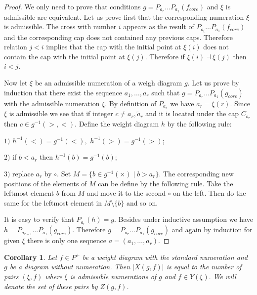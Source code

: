 \documentclass[12pt,reqno]{amsart}
\newtheorem{corollary}[thm]{Corollary}
\begin{document}
\begin{proof}  We only need to prove that conditions  $g=P_{a_r}\dots P_{a_1}(f_{core})$ and $\xi$ is admissible are equivalent.  Let us prove  first that the  corresponding numeration  $\xi$ is admissible. The cross with number $i$ appears as  the result of $P_{a_i}\dots P_{a_1}(f_{core})$  and the corresponding cap  does not contained any previous caps. Therefore relation $j<i$ implies  that  the cap with the initial point at $\xi(i)$ does not contain  the cap with the initial point at $\xi(j)$. Therefore if $\xi(i)\dashv \xi(j)$ then $i<j$. 


Now let $\xi$ be an admissible numeration of a weigh diagram $g$. Let us prove by induction that there exist the sequence $a_1,\dots,a_r$ 
such that  $g=P_{a_r}\dots P_{a_1}(g_{core})$  with the admissible numeration $\xi$. By definition of $P_{a_r}$ we have $a_r=\xi(r)$. Since $\xi$ is admissible we see that if  integer $c\ne a_r,\tilde a_r$  and  it is located   under the cap $C_{a_r}$ then $c\in g^{-1}(>,<)$.  Define the  weight diagram  $h$ by the following rule: 

$1)$ $h^{-1}(<)=g^{-1}(<),\,\,h^{-1}(>)=g^{-1}(>)$;

$2)$ if $b<a_r$ then $h^{-1}(b)=g^{-1}(b)$;

$3)$   replace $a_r$ by $\circ$. Set $M=\{b\in g^{-1}(\times)\mid b> a_r\}$. The corresponding new positions  of the elements of $M$ can be define by the following rule. Take the leftmost  element  $b$ from $M$ and   move it to  the second  $\circ $ on the left.  Then do  the same for the  leftmost element in   $M\setminus\{b\}$ and  so on. 

It is easy to verify  that $P_{a_r}(h)=g.$ Besides under inductive assumption we have $h=P_{a_{r-1}}\dots P_{a_1}(g_{core})$. Therefore 
$g=P_{a_r}\dots P_{a_1}(g_{core})$ and again by induction for given $\xi$ there is only one sequence $a=(a_1,\dots,a_r)$.
\end{proof} 






\begin{corollary} Let $f\in P^{+}$ be a weight diagram with the standard numeration and $g$ be a diagram without numeration. Then $|X(g,f)|$ is equal to the number of pairs $(\xi,f)$ where $\xi$ is admissible numerations  of $g$  and   $f\in Y(\xi).$ We will denote the set of these pairs by $Z(g,f)$.
\end{corollary}
\end{document}
